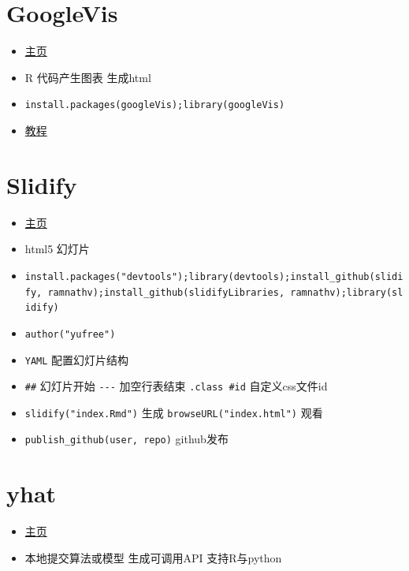 \documentclass[]{book}
\providecommand{\tightlist}{%
  \setlength{\itemsep}{0pt}\setlength{\parskip}{0pt}}
\begin{document}
\hypertarget{googlevis}{%
\section{GoogleVis}\label{googlevis}}

\begin{itemize}
\tightlist
\item
  \href{https://developers.google.com/chart/interactive/docs/gallery}{主页}
\item
  R 代码产生图表 生成html
\item
  \texttt{install.packages(\textquotesingle{}googleVis\textquotesingle{});library(googleVis)}
\item
  \href{http://decastillo.github.io/googleVis_Tutorial/}{教程}
\end{itemize}

\hypertarget{slidify}{%
\section{Slidify}\label{slidify}}

\begin{itemize}
\tightlist
\item
  \href{slidify.org}{主页}
\item
  html5 幻灯片
\item
  \texttt{install.packages("devtools");library(devtools);install\_github(\textquotesingle{}slidify\textquotesingle{},\ \textquotesingle{}ramnathv\textquotesingle{});install\_github(\textquotesingle{}slidifyLibraries\textquotesingle{},\ \textquotesingle{}ramnathv\textquotesingle{});library(slidify)}
\item
  \texttt{author("yufree")}
\item
  \texttt{YAML} 配置幻灯片结构
\item
  \texttt{\#\#} 幻灯片开始 \texttt{-\/-\/-} 加空行表结束 \texttt{.class\ \#id} 自定义css文件id
\item
  \texttt{slidify("index.Rmd")} 生成 \texttt{browseURL("index.html")} 观看
\item
  \texttt{publish\_github(user,\ repo)} github发布
\end{itemize}

\hypertarget{yhat}{%
\section{yhat}\label{yhat}}

\begin{itemize}
\tightlist
\item
  \href{https://yhathq.com/}{主页}
\item
  本地提交算法或模型 生成可调用API 支持R与python
\end{itemize}
\end{document}
